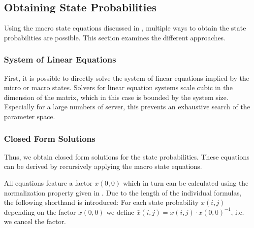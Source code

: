 \subsection{Obtaining State Probabilities}\label{sec:cloud:data_centers:closed_form_solution}
Using the macro state equations discussed in , multiple ways to obtain the state probabilities are possible.
This section examines the different approaches.

\subsubsection*{System of Linear Equations}
First, it is possible to directly solve the system of linear equations implied by the micro or macro states.
Solvers for linear equation systems scale cubic in the dimension of the matrix, which in this case is bounded by the system size.
Especially for a large numbers of server, this prevents an exhaustive search of the parameter space.

\subsubsection*{Closed Form Solutions}
Thus, we obtain closed form solutions for the state probabilities.
These equations can be derived by recursively applying the macro state equations.

All equations feature a factor \(x(0, 0)\) which in turn can be calculated using the normalization property given in .
Due to the length of the individual formulas, the following shorthand is introduced:
For each state probability \(x(i, j)\) depending on the factor \(x(0,0)\) we define \(\bar{x}(i, j) = x(i, j) \cdot x(0, 0)^{-1}\), i.e. we cancel the factor.

